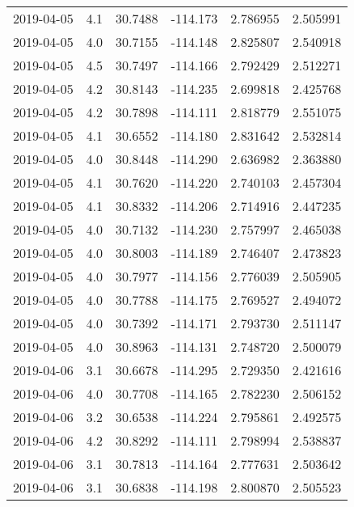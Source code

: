 \begin{tabular}{lrrrrr}
2019-04-05 &       4.1 &  30.7488 &  -114.173 &         2.786955 &         2.505991 \\
2019-04-05 &       4.0 &  30.7155 &  -114.148 &         2.825807 &         2.540918 \\
2019-04-05 &       4.5 &  30.7497 &  -114.166 &         2.792429 &         2.512271 \\
2019-04-05 &       4.2 &  30.8143 &  -114.235 &         2.699818 &         2.425768 \\
2019-04-05 &       4.2 &  30.7898 &  -114.111 &         2.818779 &         2.551075 \\
2019-04-05 &       4.1 &  30.6552 &  -114.180 &         2.831642 &         2.532814 \\
2019-04-05 &       4.0 &  30.8448 &  -114.290 &         2.636982 &         2.363880 \\
2019-04-05 &       4.1 &  30.7620 &  -114.220 &         2.740103 &         2.457304 \\
2019-04-05 &       4.1 &  30.8332 &  -114.206 &         2.714916 &         2.447235 \\
2019-04-05 &       4.0 &  30.7132 &  -114.230 &         2.757997 &         2.465038 \\
2019-04-05 &       4.0 &  30.8003 &  -114.189 &         2.746407 &         2.473823 \\
2019-04-05 &       4.0 &  30.7977 &  -114.156 &         2.776039 &         2.505905 \\
2019-04-05 &       4.0 &  30.7788 &  -114.175 &         2.769527 &         2.494072 \\
2019-04-05 &       4.0 &  30.7392 &  -114.171 &         2.793730 &         2.511147 \\
2019-04-05 &       4.0 &  30.8963 &  -114.131 &         2.748720 &         2.500079 \\
2019-04-06 &       3.1 &  30.6678 &  -114.295 &         2.729350 &         2.421616 \\
2019-04-06 &       4.0 &  30.7708 &  -114.165 &         2.782230 &         2.506152 \\
2019-04-06 &       3.2 &  30.6538 &  -114.224 &         2.795861 &         2.492575 \\
2019-04-06 &       4.2 &  30.8292 &  -114.111 &         2.798994 &         2.538837 \\
2019-04-06 &       3.1 &  30.7813 &  -114.164 &         2.777631 &         2.503642 \\
2019-04-06 &       3.1 &  30.6838 &  -114.198 &         2.800870 &         2.505523 \\

\end{tabular}
